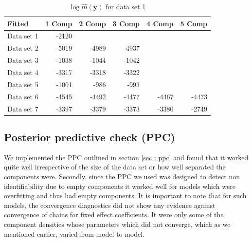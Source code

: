 \begin{table}[!htb]
\centering
\captionsetup{justification=centering}
\caption{$\log{\hat{m}(\boldsymbol{y})}$ for data set 1}
\label{table : marginal_likelihood_results} 
\begin{tabular}{lrrrrr}
\toprule
Fitted & 1 Comp & 2 Comp & 3 Comp & 4 Comp & 5 Comp \\\midrule
Data set 1 & -2120 & & & & \\
Data set 2 & -5019 & -4989 & -4937 & & \\
Data set 3 & -1038 & -1044 & -1042 & & \\
Data set 4 & -3317 & -3318 & -3322 & & \\
Data set 5 & -1001 & -986 & -993 & &  \\
Data set 6 & -4545 & -4492 & -4477 & -4467 & -4473\\
Data set 7 & -3397 & -3379 & -3373 & -3380 & -2749\\ \bottomrule
\end{tabular}
\end{table}

\subsection{Posterior predictive check (PPC)}
\label{subsec : ppc_simulation}
We implemented the PPC outlined in section \ref{sec : ppc} and found that it worked quite well irrespective of the size of the data set or how well separated the components were. Secondly, since the PPC we used was designed to detect non identifiability due to empty components it worked well for models which were overfitting and thus had empty components. It is important to note that for such models, the convergence diagnostics did not show any evidence against convergence of chains for fixed effect coefficients. It were only some of the component densities whose parameters which did not converge, which as we mentioned earlier, varied from model to model.\\

